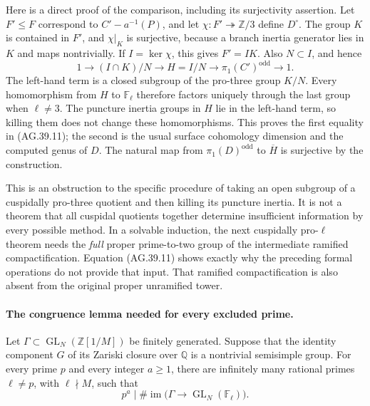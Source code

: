 Here is a direct proof of the comparison, including its
surjectivity assertion. Let \(F'\leq F\) correspond to
\(C'-a^{-1}(P)\), and let
\(\chi:F'\twoheadrightarrow\mathbb Z/3\) define
\(D^\circ\). The group \(K\) is contained in \(F'\),
and \(\chi|_K\) is surjective, because a branch inertia
generator lies in \(K\) and maps nontrivially. If
\(I=\ker\chi\), this gives \(F'=IK\). Also \(N\subset I\),
and hence
\[
 1\longrightarrow (I\cap K)/N\longrightarrow
 H=I/N\longrightarrow \pi_1(C')^{\mathrm{odd}}
 \longrightarrow1.                                  \tag{AG.39.12}
\]
The left-hand term is a closed subgroup of the pro-three
group \(K/N\). Every homomorphism from \(H\) to
\(\mathbb F_\ell\) therefore factors uniquely through
the last group when \(\ell\ne3\). The puncture inertia
groups in \(H\) lie in the left-hand term, so killing them
does not change these homomorphisms. This proves the first
equality in (AG.39.11); the second is the usual surface
cohomology dimension and the computed genus of \(D\).
The natural map from \(\pi_1(D)^{\mathrm{odd}}\) to
\(\overline H\) is surjective by the construction.

This is an obstruction to the specific procedure of taking
an open subgroup of a cuspidally pro-three quotient and then
killing its puncture inertia. It is not a theorem that all
cuspidal quotients together determine insufficient information
by every possible method. In a solvable induction, the next
cuspidally pro-\(\ell\) theorem needs the \emph{full} proper
prime-to-two group of the intermediate ramified compactification.
Equation (AG.39.11) shows exactly why the preceding formal
operations do not provide that input. That ramified
compactification is also absent from the original proper
unramified tower.


\paragraph{The congruence lemma needed for every excluded prime.}
Let \(\Gamma\subset\operatorname{GL}_N(\mathbb Z[1/M])\) be
finitely generated. Suppose that the identity component \(G\) of its
Zariski closure over \(\mathbb Q\) is a nontrivial semisimple group.
For every prime \(p\) and every integer \(a\geq1\), there are
infinitely many rational primes \(\ell\ne p\), with \(\ell\nmid M\),
such that
\[
       p^a\mid
       \#\operatorname{im}\bigl(\Gamma\longrightarrow
                    \operatorname{GL}_N(\mathbb F_\ell)\bigr).
                                                        \tag{AG.39.13}
\]

